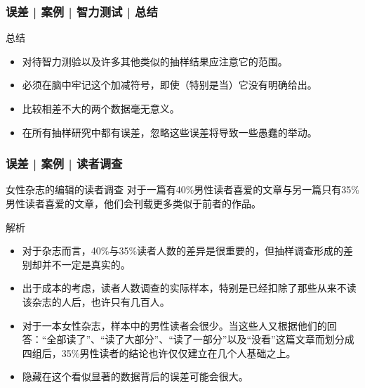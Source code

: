 \begin{frame}
  \frametitle{误差 | 案例 | 智力测试 | 总结}
  \begin{block}{总结}
    \begin{itemize}
      \item 对待智力测验以及许多其他类似的抽样结果应注意它的范围。
      \item 必须在脑中牢记这个加减符号，即使（特别是当）它没有明确给出。
      \item 比较相差不大的两个数据毫无意义。
      \item 在所有抽样研究中都有误差，忽略这些误差将导致一些愚蠢的举动。
    \end{itemize}
  \end{block}
\end{frame}

\begin{frame}
  \frametitle{误差 | 案例 | 读者调查}
  \begin{block}{女性杂志的编辑的读者调查}
    对于一篇有40\%男性读者喜爱的文章与另一篇只有35\%男性读者喜爱的文章，他们会刊载更多类似于前者的作品。
  \end{block}
  \pause \pause \pause \pause
  \begin{block}{解析}
    \begin{itemize}
      \item 对于杂志而言，40\%与35\%读者人数的差异是很重要的，但抽样调查形成的差别却并不一定是真实的。
      \item 出于成本的考虑，读者人数调查的实际样本，特别是已经扣除了那些从来不读该杂志的人后，也许只有几百人。
      \item 对于一本女性杂志，样本中的男性读者会很少。当这些人又根据他们的回答：“全部读了”、“读了大部分”、“读了一部分”以及“没看”这篇文章而划分成四组后，35\%男性读者的结论也许仅仅建立在几个人基础之上。
      \item 隐藏在这个看似显著的数据背后的误差可能会很大。
    \end{itemize}
  \end{block}
\end{frame}

